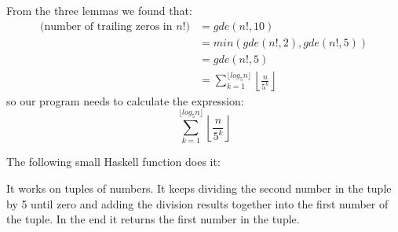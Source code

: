 \noindent From the three lemmas we found that:
\begin{equation*}
\begin{split}
\text{(number of trailing zeros in } n! )  & = gde(n!, 10)  \\
&= min(gde(n!, 2), gde(n!, 5))  \\
& = gde(n!, 5)  \\
& = \sum_{k = 1}^{\lfloor log_5 n \rfloor}   \left\lfloor\frac{n}{5^k}\right\rfloor
\end{split}   
\end{equation*}
\noindent so our program needs to calculate the expression:
\begin{equation*}
\sum_{k = 1}^{\lfloor log_5 n \rfloor}   \left\lfloor\frac{n}{5^k}\right\rfloor
\end{equation*}

\noindent The following small Haskell function does it:



\noindent It works on tuples of numbers. It keeps dividing the second number in the tuple by 5 until zero and adding the division results together into the first number of the tuple. In the end it returns the first number in the tuple.
